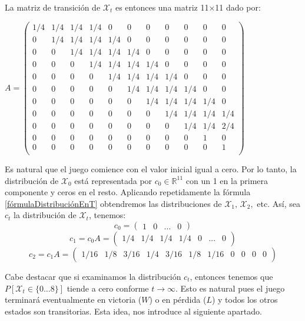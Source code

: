 \begin{exampleth}
La matriz de transición de $\mathcal{X}_t$ es entonces una matriz 11$\times$11 dado por:

\begin{center}
    $A=\begin{pmatrix}
    1/4 & 1/4 & 1/4 & 1/4 & 0 & 0 & 0 & 0 & 0 & 0 & 0 \\   
    0 & 1/4 & 1/4 & 1/4 & 1/4 & 0 & 0 & 0 & 0 & 0 & 0 \\
    0 & 0 & 1/4 & 1/4 & 1/4 & 1/4 & 0 & 0 & 0 & 0 & 0 \\
    0 & 0 & 0 & 1/4 & 1/4 & 1/4 & 1/4 & 0 & 0 & 0 & 0 \\
    0 & 0 & 0 & 0 & 1/4 & 1/4 & 1/4 & 1/4 & 0 & 0 & 0 \\
    0 & 0 & 0 & 0 & 0 & 1/4 & 1/4 & 1/4 & 1/4 & 0 & 0 \\
    0 & 0 & 0 & 0 & 0 & 0 & 1/4 & 1/4 & 1/4 & 1/4 & 0 \\
    0 & 0 & 0 & 0 & 0 & 0 & 0 & 1/4 & 1/4 & 1/4 & 1/4 \\
    0 & 0 & 0 & 0 & 0 & 0 & 0 & 0 & 1/4 & 1/4 & 2/4 \\
    0 & 0 & 0 & 0 & 0 & 0 & 0 & 0 & 0 & 1 & 0 \\
    0 & 0 & 0 & 0 & 0 & 0 & 0 & 0 & 0 & 0 & 1 \\
    \end{pmatrix}$
\end{center}

Es natural que el juego comience con el valor inicial igual a cero. Por lo tanto, la distribución de $\mathcal{X}_0$ está representada por $c_0\in\mathbb{R}^{11}$ con un 1 en la primera componente y ceros en el resto. Aplicando repetidamente la fórmula \ref{fórmulaDistribuciónEnT} obtendremos las distribuciones de $\mathcal{X}_1,\,\mathcal{X}_2,$ etc. Así, sea $c_t$ la distribución de $\mathcal{X}_t$, tenemos:
\[
c_0=\begin{pmatrix}
1 & 0 & \dots & 0
\end{pmatrix}\]
\[
c_1=c_0A=\begin{pmatrix}
1/4 & 1/4 & 1/4 & 1/4 & 0 & \dots & 0
\end{pmatrix}\]
\[
c_2=c_1A=\begin{pmatrix}
1/16 & 1/8 & 3/16 & 1/4 & 3/16 & 1/8 & 1/16  & 0 & 0 & 0 & 0
\end{pmatrix}
\]

Cabe destacar que si examinamos la distribución $c_t$, entonces tenemos que $P[\mathcal{X}_t\in\{0\dots8\}]$ tiende a cero conforme $t\rightarrow\infty$. Esto es natural pues el juego terminará eventualmente en victoria ($W$) o en pérdida ($L$) y todos los otros estados son transitorias. Esta idea, nos introduce al siguiente apartado.

\end{exampleth}

